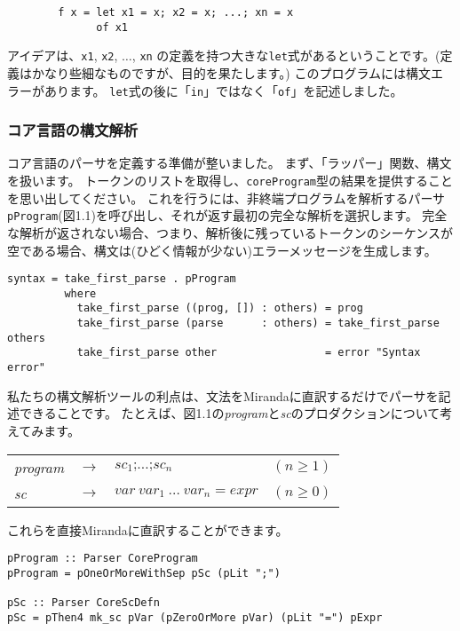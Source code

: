 \documentclass{jarticle}
\begin{document}
\begin{verbatim}
        f x = let x1 = x; x2 = x; ...; xn = x
              of x1
\end{verbatim}

アイデアは、\texttt{x1}, \texttt{x2}, $\ldots$, \texttt{xn} の定義を持つ大きな\texttt{let}式があるということです。(定義はかなり些細なものですが、目的を果たします。)
このプログラムには構文エラーがあります。
\texttt{let}式の後に「\texttt{in}」ではなく「\texttt{of}」を記述しました。

\subsubsection{コア言語の構文解析}

コア言語のパーサを定義する準備が整いました。
まず、「ラッパー」関数、構文を扱います。
トークンのリストを取得し、\texttt{coreProgram}型の結果を提供することを思い出してください。
これを行うには、非終端プログラムを解析するパーサ\texttt{pProgram}(図1.1)を呼び出し、それが返す最初の完全な解析を選択します。
完全な解析が返されない場合、つまり、解析後に残っているトークンのシーケンスが空である場合、構文は(ひどく情報が少ない)エラーメッセージを生成します。

\begin{verbatim}
syntax = take_first_parse . pProgram
         where
           take_first_parse ((prog, []) : others) = prog
           take_first_parse (parse      : others) = take_first_parse others
           take_first_parse other                 = error "Syntax error"
\end{verbatim}

私たちの構文解析ツールの利点は、文法をMirandaに直訳するだけでパーサを記述できることです。
たとえば、図1.1の\textit{program}と\textit{sc}のプロダクションについて考えてみます。

\begin{center}
	\begin{tabular} {l c l l}
		\textit{program} & $\rightarrow$ & $sc_1 \texttt{;} \ldots \texttt{;} sc_n$ & $(n \geq 1)$ \\
		\textit{sc}      & $\rightarrow$ & $var ~ var_1 ~ \ldots ~ var_n = expr$    & $(n \geq 0)$
	\end{tabular}
\end{center}

これらを直接Mirandaに直訳することができます。

\begin{verbatim}
pProgram :: Parser CoreProgram
pProgram = pOneOrMoreWithSep pSc (pLit ";")

pSc :: Parser CoreScDefn
pSc = pThen4 mk_sc pVar (pZeroOrMore pVar) (pLit "=") pExpr
\end{verbatim}
\end{document}
